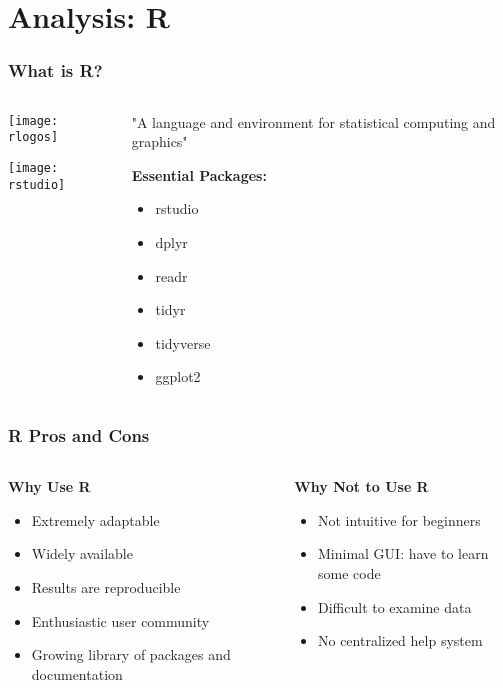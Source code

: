 \documentclass{beamer}
\begin{document}
\section{Analysis: R}

\begin{frame}
\frametitle{What is R?}
\begin{columns}
 \begin{column}[T]{0.6\textwidth}
  \texttt{[image: rlogos]}
  
  \texttt{[image: rstudio]}
 \end{column} 
 \begin{column}[T]{0.4\textwidth}
  "A language and environment for statistical computing and graphics"
  \medskip
  
  \textbf{Essential Packages:}
  \begin{itemize}
   \item rstudio 
   \item dplyr
   \item readr
   \item tidyr
   \item tidyverse
   \item ggplot2
  \end{itemize}
 \end{column}
\end{columns}

\end{frame}

\begin{frame}
\frametitle{R Pros and Cons}
 \begin{columns}
  \begin{column}[T]{0.5\textwidth}
   \textbf{Why Use R}
   \begin{itemize}
    \item Extremely adaptable
    \item Widely available
    \item Results are reproducible
    \item Enthusiastic user community
	\item Growing library of packages and documentation
   \end{itemize}
  \end{column} 
  \begin{column}[T]{0.5\textwidth}
   \textbf{Why Not to Use R}
   \begin{itemize}
    \item Not intuitive for beginners
	\item Minimal GUI: have to learn some code
    \item Difficult to examine data
    \item No centralized help system
   \end{itemize}
  \end{column}
 \end{columns}

\end{frame}
\end{document}
